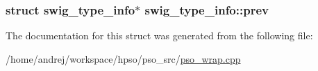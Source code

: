 \hypertarget{structswig__type__info_06770670038822319b2a1ce1e69786b7}{
\subsubsection{\setlength{\rightskip}{0pt plus 5cm}struct {\bf swig\_\-type\_\-info}$\ast$ {\bf swig\_\-type\_\-info::prev}}}
\label{structswig__type__info_06770670038822319b2a1ce1e69786b7}




The documentation for this struct was generated from the following file:\begin{CompactItemize}
\item 
/home/andrej/workspace/hpso/pso\_\-src/\hyperlink{pso__wrap_8cpp}{pso\_\-wrap.cpp}\end{CompactItemize}
